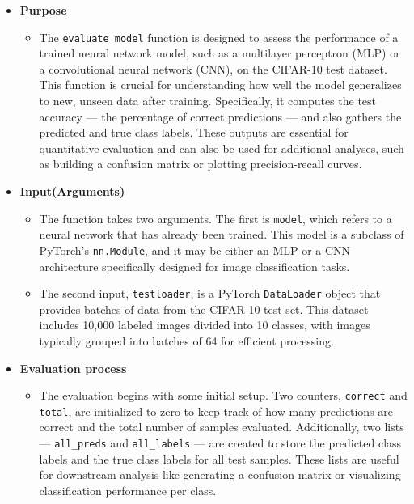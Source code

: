 \documentclass[a4paper,12pt]{article}
\begin{document}
\begin{itemize}
    \item \textbf{Purpose}
    \begin{itemize}
        \item The \verb|evaluate_model| function is designed to assess the performance of a trained neural network model, such as a multilayer perceptron (MLP) or a convolutional neural network (CNN), on the CIFAR-10 test dataset. This function is crucial for understanding how well the model generalizes to new, unseen data after training. Specifically, it computes the test accuracy — the percentage of correct predictions — and also gathers the predicted and true class labels. These outputs are essential for quantitative evaluation and can also be used for additional analyses, such as building a confusion matrix or plotting precision-recall curves.
    \end{itemize}

    \item \textbf{Input(Arguments)}
    \begin{itemize}
        \item The function takes two arguments. The first is \verb|model|, which refers to a neural network that has already been trained. This model is a subclass of PyTorch’s \verb|nn.Module|, and it may be either an MLP or a CNN architecture specifically designed for image classification tasks. 
        
        \item The second input, \verb|testloader|, is a PyTorch \verb|DataLoader| object that provides batches of data from the CIFAR-10 test set. This dataset includes 10,000 labeled images divided into 10 classes, with images typically grouped into batches of 64 for efficient processing.
    \end{itemize}

    \item \textbf{Evaluation process}
    \begin{itemize}
        \item The evaluation begins with some initial setup. Two counters, \verb|correct| and \verb|total|, are initialized to zero to keep track of how many predictions are correct and the total number of samples evaluated. Additionally, two lists — \verb|all_preds| and \verb|all_labels| — are created to store the predicted class labels and the true class labels for all test samples. These lists are useful for downstream analysis like generating a confusion matrix or visualizing classification performance per class.


\end{itemize}
\end{itemize}
\end{document}

